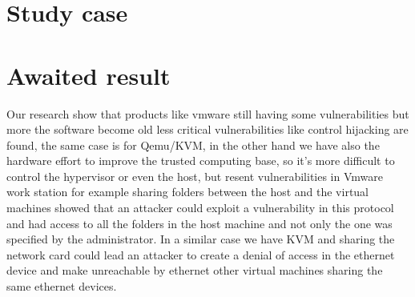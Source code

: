 \section{Study case}

\section{Awaited result}

Our research show that products like vmware still having some vulnerabilities but 
more the software become old less critical vulnerabilities like control hijacking are found,
the same case is for Qemu/KVM, in the other hand we have also the hardware effort to
improve the trusted computing base, so it's more difficult to control the hypervisor or even
the host, but resent vulnerabilities in Vmware work station for example sharing folders
between the host and the virtual machines showed that an attacker could exploit a vulnerability
in this protocol and had access to all the folders in the host machine and not only the one was
specified by the administrator.
In a similar case we have KVM and sharing the network card could lead an attacker to create
a denial of access in the ethernet device and make unreachable by ethernet other virtual machines
sharing the same ethernet devices. 
